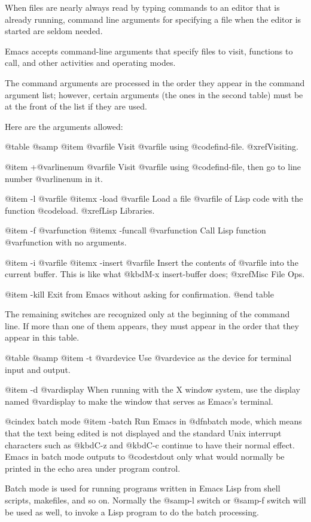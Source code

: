{{{  When files are nearly always read by typing commands to an editor that is
already running, command line arguments for specifying a file when the
editor is started are seldom needed.

  Emacs accepts command-line arguments that specify files to visit,
functions to call, and other activities and operating modes.

  The command arguments are processed in the order they appear in the
command argument list; however, certain arguments (the ones in the second
table) must be at the front of the list if they are used.

  Here are the arguments allowed:

@table @samp
@item @var{file}
Visit @var{file} using @code{find-file}.  @xref{Visiting}.

@item +@var{linenum} @var{file}
Visit @var{file} using @code{find-file}, then go to line number
@var{linenum} in it.

@item -l @var{file}
@itemx -load @var{file}
Load a file @var{file} of Lisp code with the function @code{load}.
@xref{Lisp Libraries}.

@item -f @var{function}
@itemx -funcall @var{function}
Call Lisp function @var{function} with no arguments.

@item -i @var{file}
@itemx -insert @var{file}
Insert the contents of @var{file} into the current buffer.
This is like what @kbd{M-x insert-buffer} does; @xref{Misc File Ops}.

@item -kill
Exit from Emacs without asking for confirmation.
@end table

  The remaining switches are recognized only at the beginning of the
command line.  If more than one of them appears, they must appear in the
order that they appear in this table.

@table @samp
@item -t @var{device}
Use @var{device} as the device for terminal input and output.

@item -d @var{display}
When running with the X window system, use the display named @var{display}
to make the window that serves as Emacs's terminal.

@cindex batch mode
@item -batch
Run Emacs in @dfn{batch mode}, which means that the text being edited is
not displayed and the standard Unix interrupt characters such as @kbd{C-z}
and @kbd{C-c} continue to have their normal effect.  Emacs in batch mode
outputs to @code{stdout} only what would normally be printed in the echo
area under program control.

Batch mode is used for running programs written in Emacs Lisp from
shell scripts, makefiles, and so on.  Normally the @samp{-l} switch
or @samp{-f} switch will be used as well, to invoke a Lisp program
to do the batch processing.

}}}
